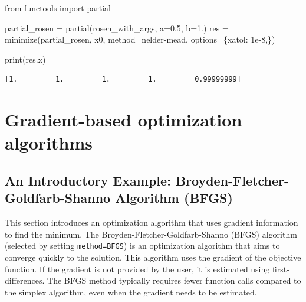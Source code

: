 \documentclass[
  letterpaper,
  DIV=11,
  numbers=noendperiod]{scrreprt}
\newenvironment{Shaded}{\begin{snugshade}}{\end{snugshade}}
\newcommand{\BuiltInTok}[1]{\textcolor[rgb]{0.00,0.23,0.31}{#1}}
\newcommand{\FloatTok}[1]{\textcolor[rgb]{0.68,0.00,0.00}{#1}}
\newcommand{\ImportTok}[1]{\textcolor[rgb]{0.00,0.46,0.62}{#1}}
\newcommand{\NormalTok}[1]{\textcolor[rgb]{0.00,0.23,0.31}{#1}}
\newcommand{\OperatorTok}[1]{\textcolor[rgb]{0.37,0.37,0.37}{#1}}
\newcommand{\StringTok}[1]{\textcolor[rgb]{0.13,0.47,0.30}{#1}}
\begin{document}
\begin{Shaded}
\begin{Highlighting}[]
\ImportTok{from}\NormalTok{ functools }\ImportTok{import}\NormalTok{ partial}

\NormalTok{partial\_rosen }\OperatorTok{=}\NormalTok{ partial(rosen\_with\_args, a}\OperatorTok{=}\FloatTok{0.5}\NormalTok{, b}\OperatorTok{=}\FloatTok{1.}\NormalTok{)}
\NormalTok{res }\OperatorTok{=}\NormalTok{ minimize(partial\_rosen, x0, method}\OperatorTok{=}\StringTok{\textquotesingle{}nelder{-}mead\textquotesingle{}}\NormalTok{,}
\NormalTok{               options}\OperatorTok{=}\NormalTok{\{}\StringTok{\textquotesingle{}xatol\textquotesingle{}}\NormalTok{: }\FloatTok{1e{-}8}\NormalTok{,\})}

\BuiltInTok{print}\NormalTok{(res.x)}
\end{Highlighting}
\end{Shaded}

\begin{verbatim}
[1.         1.         1.         1.         0.99999999]
\end{verbatim}

\hypertarget{gradient-based-optimization-algorithms}{%
\section{Gradient-based optimization
algorithms}\label{gradient-based-optimization-algorithms}}

\hypertarget{sec-bfgs-intro}{%
\subsection{An Introductory Example: Broyden-Fletcher-Goldfarb-Shanno
Algorithm (BFGS)}\label{sec-bfgs-intro}}

This section introduces an optimization algorithm that uses gradient
information to find the minimum. The Broyden-Fletcher-Goldfarb-Shanno
(BFGS) algorithm (selected by setting
\texttt{method=\textquotesingle{}BFGS\textquotesingle{}}) is an
optimization algorithm that aims to converge quickly to the solution.
This algorithm uses the gradient of the objective function. If the
gradient is not provided by the user, it is estimated using
first-differences. The BFGS method typically requires fewer function
calls compared to the simplex algorithm, even when the gradient needs to
be estimated.
\end{document}
